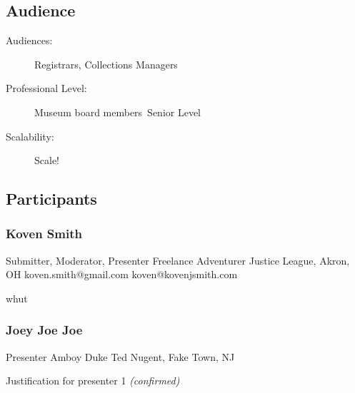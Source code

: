 \documentclass{report}
\begin{document}
              \subsection*{Audience}
                \begin{description}
                  \item [Audiences:]Registrars, Collections Managers~
                  \item[Professional Level:]Museum board members~Senior Level~
                \item[Scalability:] Scale!

							
              \end{description}
            \subsection*{Participants}
              \subsubsection*{ Koven Smith }
              Submitter, Moderator, Presenter\newline
              Freelance Adventurer\newline
              Justice League, Akron, OH
              \newline
              koven.smith@gmail.com\newline
              koven@kovenjsmith.com\newline

              whut\newline


              

              
                \subsubsection*{ Joey Joe Joe }
                Presenter\newline
                Amboy Duke\newline
                Ted Nugent, Fake Town, NJ
                \newline
                
                
                

                Justification for presenter 1
                \emph{ (confirmed) }
              
\end{document}
